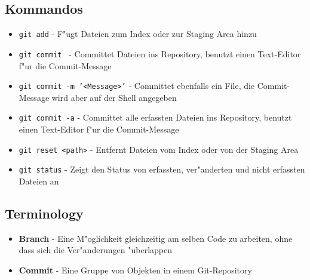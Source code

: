 \subsection{Kommandos}
\begin{itemize}
\item\texttt{git add} - F"ugt Dateien zum Index oder zur Staging Area hinzu

\item\texttt{git commit } - Committet Dateien ins Repository, benutzt einen Text-Editor f"ur die Commit-Message

\item\texttt{git commit -m '<Message>'} - Committet ebenfalls ein File, die Commit-Message wird aber auf der Shell angegeben

\item\texttt{git commit -a} - Committet alle erfassten Dateien ins Repository, benutzt einen Text-Editor f"ur die Commit-Message

\item\texttt{git reset <path>} - Entfernt Dateien vom Index oder von der Staging Area

\item\texttt{git status} - Zeigt den Status von erfassten, ver"anderten und nicht erfassten Dateien an
\end{itemize}

\subsection{Terminology}
\begin{itemize}
\item\textbf{Branch} - Eine M"oglichkeit gleichzeitig am selben Code zu arbeiten, ohne dass sich die Ver"anderungen "uberlappen

\item\textbf{Commit} - Eine Gruppe von Objekten in einem Git-Repository
\end{itemize}
